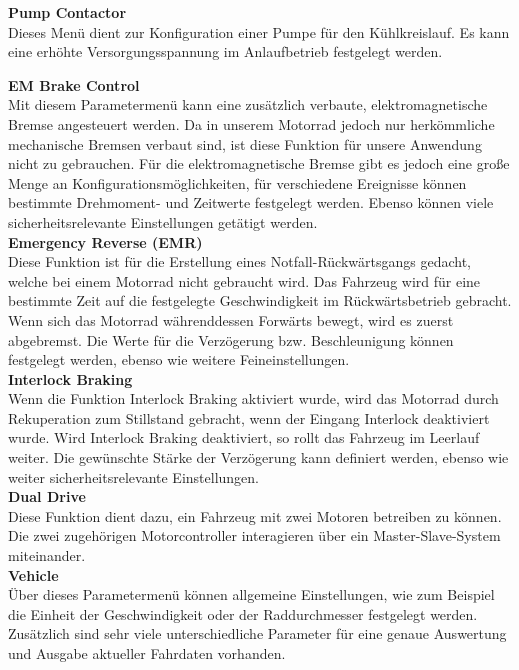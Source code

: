 \textbf{Pump Contactor}\\[1mm]
Dieses Menü dient zur Konfiguration einer Pumpe für den Kühlkreislauf. Es kann eine erhöhte Versorgungsspannung im Anlaufbetrieb festgelegt werden.

\newpage

\textbf{EM Brake Control}\\[1mm]
Mit diesem Parametermenü kann eine zusätzlich verbaute, elektromagnetische Bremse angesteuert werden. Da in unserem Motorrad jedoch nur herkömmliche mechanische Bremsen verbaut sind, ist diese Funktion für unsere Anwendung nicht zu gebrauchen. Für die elektromagnetische Bremse gibt es jedoch eine große Menge an Konfigurationsmöglichkeiten, für verschiedene Ereignisse können bestimmte Drehmoment- und Zeitwerte festgelegt werden. Ebenso können viele sicherheitsrelevante Einstellungen getätigt werden. 
\\[4mm]

\textbf{Emergency Reverse (EMR)}\\[1mm]
Diese Funktion ist für die Erstellung eines Notfall-Rückwärtsgangs gedacht, welche bei einem Motorrad nicht gebraucht wird. Das Fahrzeug wird für eine bestimmte Zeit auf die festgelegte Geschwindigkeit im Rückwärtsbetrieb gebracht. Wenn sich das Motorrad währenddessen Forwärts bewegt, wird es zuerst abgebremst. Die Werte für die Verzögerung bzw. Beschleunigung können festgelegt werden, ebenso wie weitere Feineinstellungen.
\\[4mm]

\textbf{Interlock Braking}\\[1mm]
Wenn die Funktion Interlock Braking aktiviert wurde, wird das Motorrad durch Rekuperation zum Stillstand gebracht, wenn der Eingang Interlock deaktiviert wurde. Wird Interlock Braking deaktiviert, so rollt das Fahrzeug im Leerlauf weiter. Die gewünschte Stärke der Verzögerung kann definiert werden, ebenso wie weiter sicherheitsrelevante Einstellungen.
\\[4mm]

\textbf{Dual Drive}\\[1mm]
Diese Funktion dient dazu, ein Fahrzeug mit zwei Motoren betreiben zu können. Die zwei zugehörigen Motorcontroller interagieren über ein Master-Slave-System miteinander.
\\[4mm]

\textbf{Vehicle}\\[1mm]
Über dieses Parametermenü können allgemeine Einstellungen, wie zum Beispiel die Einheit der Geschwindigkeit oder der Raddurchmesser festgelegt werden. Zusätzlich sind sehr viele unterschiedliche Parameter für eine genaue Auswertung und Ausgabe aktueller Fahrdaten vorhanden.
\\[4mm]

